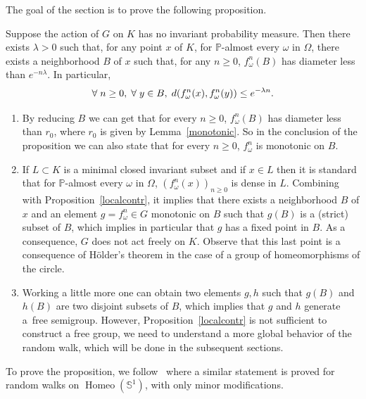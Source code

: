 \documentclass[AHL,Unicode,longabstracts,published]{cedram}
\DeclareMathOperator{\Homeo}{Homeo}
\newcommand{\bbP}{\mathbb{P}}
\newcommand{\bbS}{\mathbb{S}}
\newcounter{setofcase}
\newcounter{case}[setofcase]
\let\originalleft\left
\let\originalright\right
\renewcommand{\left}{\mathopen{}\mathclose\bgroup\originalleft}
\renewcommand{\right}{\aftergroup\egroup\originalright}
\let\oldforall\forall
\renewcommand*{\forall}{\mathrel{\oldforall}}
\begin{document}
The goal of the section is to prove the following proposition.

\begin{prop}\label{localcontr}
Suppose the action of $G$ on $K$ has no invariant probability measure. Then there exists $\lambda>0$ such that, for any point $x$ of $K$, for $\bbP$-almost every $\omega$ in $\Omega$, there exists a neighborhood $B$ of $x$ such that, for any $n\geq 0$, $f_\omega^n(B)$ has diameter less than $e^{-n\lambda}$. In particular,
\[
\forall n \geq 0,\;\forall y\in B,\; d\left(f_\omega^n(x),f_\omega^n(y)\right) \leq e^{-\lambda n}.
\]
\end{prop}

\begin{rema}\label{rema3.2}
\leavevmode
\begin{enumerate}
\item\label{rema3.2.1} By reducing $B$ we can get that for every $n\ge 0$, $f_\omega^n(B)$ has diameter less than $r_0$, where $r_0$ is given by Lemma~\ref{monotonic}. So in the conclusion of the proposition we can also state that for every $n\ge 0$, $f_\omega^n$ is monotonic on $B$.
\item\label{rema3.2.2} If $L\subset K$ is a minimal closed invariant subset and if $x\in L$ then it is standard that for $\bbP$-almost every $\omega$ in $\Omega$, $(f_\omega^n(x))_{n \geq 0}$ is dense in $L$. Combining with Proposition~\ref{localcontr}, it implies that there exists a neighborhood $B$ of $x$ and an element $g=f_\omega^n\in G$ monotonic on $B$ such that $g(B)$ is a (strict) subset of $B$, which implies in particular that $g$ has a fixed point in $B$. As a consequence, $G$ does not act freely on $K$. Observe that this last point is a consequence of H\"older's theorem in the case of a group of homeomorphisms of the circle.
\item\label{rema3.2.3} Working a little more one can obtain two elements $g,h$ such that $g(B)$ and $h(B)$ are two disjoint subsets of $B$, which implies that $g$ and $h$ generate a~free semigroup. However, Proposition~\ref{localcontr} is not sufficient to construct a free group, we need to understand a more global behavior of the random walk, which will be done in the subsequent sections.
\end{enumerate}
\end{rema}


To prove the proposition, we follow~\cite{Mal} where a similar statement is proved for random walks on $\Homeo(\bbS^1)$, with only minor modifications.
\end{document}
